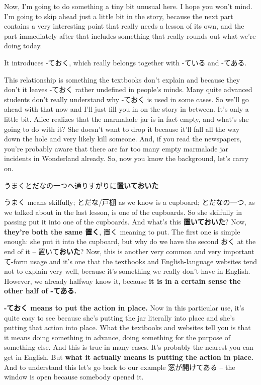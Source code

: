 Now, I'm going to do something a tiny bit unusual here. I hope you won't mind. I'm going to skip ahead just a little bit in the story, because the next part contains a very interesting point that really needs a lesson of its own, and the part immediately after that includes something that really rounds out what we're doing today.

\stopsectionlevel

\startsectionlevel[title={ておく},reference={ておく}]

It introduces -ておく, which really belongs together with -ている and -てある.

{}

This relationship is something the textbooks don't explain and because they don't it leaves -ておく rather undefined in people's minds. Many quite advanced students don't really understand why -ておく is used in some cases. So we'll go ahead with that now and I'll just fill you in on the story in between. It's only a little bit. Alice realizes that the marmalade jar is in fact empty, and what's she going to do with it? She doesn't want to drop it because it'll fall all the way down the hole and very likely kill someone. And, if you read the newspapers, you're probably aware that there are far too many empty marmalade jar incidents in Wonderland already. So, now you know the background, let's carry on.

{}

うまくとだなの一つへ通りすがりに{\bf 置いておいた}

うまく means skilfully; とだな/戸棚 as we know is a cupboard; とだなの一つ, as we talked about in the last lesson, is one of the cupboards. So she skilfully in passing put it into one of the cupboards. And what's this {\bf 置いておいた}? Now, {\bf they're both the same 置く}, 置く meaning to put. The first one is simple enough: she put it into the cupboard, but why do we have the second おく at the end of it -- 置いて{\bf おいた}? Now, this is another very common and very important て-form usage and it's one that the textbooks and English-language websites tend not to explain very well, because it's something we really don't have in English. However, we already halfway know it, because {\bf it is in a certain sense the other half of -てある.}

{}

{\bf -ておく means to put the action in place.} Now in this particular use, it's quite easy to see because she's putting the jar literally into place and she's putting that action into place. What the textbooks and websites tell you is that it means doing something in advance, doing something for the purpose of something else. And this is true in many cases. It's probably the nearest you can get in English. But {\bf what it actually means is putting the action in place.} And to understand this let's go back to our example 窓が開けてある -- the window is open because somebody opened it.

